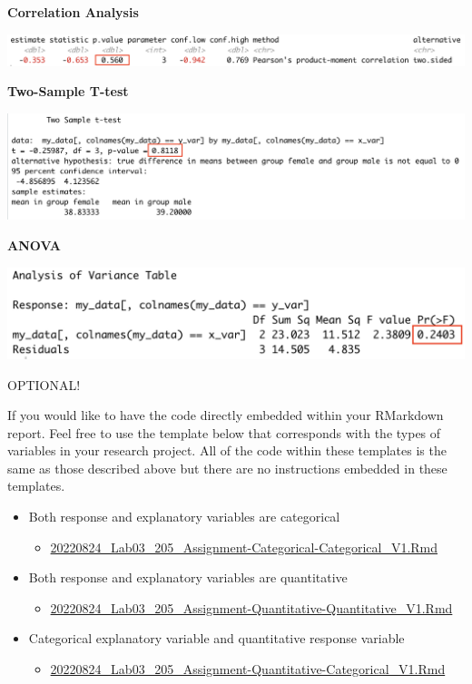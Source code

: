 \documentclass[
]{book}
\providecommand{\tightlist}{%
  \setlength{\itemsep}{0pt}\setlength{\parskip}{0pt}}
\begin{document}
\textbf{Correlation Analysis}

\includegraphics{images/correlation_example.png}

\textbf{Two-Sample T-test}

\includegraphics{images/t-test_example.png}

\textbf{ANOVA}

\includegraphics{images/anova_example.png}

OPTIONAL!

If you would like to have the code directly embedded within your RMarkdown report. Feel free to use the template below that corresponds with the types of variables in your research project. All of the code within these templates is the same as those described above but there are no instructions embedded in these templates.

\begin{itemize}
\tightlist
\item
  Both response and explanatory variables are categorical

  \begin{itemize}
  \tightlist
  \item
    \href{https://osf.io/download/98vmu}{20220824\_Lab03\_205\_Assignment-Categorical-Categorical\_V1.Rmd}
  \end{itemize}
\item
  Both response and explanatory variables are quantitative

  \begin{itemize}
  \tightlist
  \item
    \href{https://osf.io/download/75q4x}{20220824\_Lab03\_205\_Assignment-Quantitative-Quantitative\_V1.Rmd}
  \end{itemize}
\item
  Categorical explanatory variable and quantitative response variable

  \begin{itemize}
  \tightlist
  \item
    \href{https://osf.io/download/s7bng}{20220824\_Lab03\_205\_Assignment-Quantitative-Categorical\_V1.Rmd}
  \end{itemize}
\end{itemize}
\end{document}
